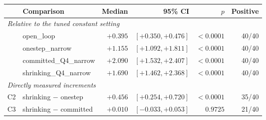 \begin{tabular}{llrrrr}
\toprule
& Comparison & Median & 95\% CI & $p$ & Positive \\
\midrule
\multicolumn{6}{l}{\emph{Relative to the tuned constant setting}} \\
 & open\_loop & $+0.395$ & $[+0.350, +0.476]$ & ${<}0.0001$ & 40/40 \\
 & onestep\_narrow & $+1.155$ & $[+1.092, +1.811]$ & ${<}0.0001$ & 40/40 \\
 & committed\_Q4\_narrow & $+2.090$ & $[+1.532, +2.407]$ & ${<}0.0001$ & 40/40 \\
 & shrinking\_Q4\_narrow & $+1.690$ & $[+1.462, +2.368]$ & ${<}0.0001$ & 40/40 \\
\midrule
\multicolumn{6}{l}{\emph{Directly measured increments}} \\
C2 & shrinking $-$ onestep & $+0.456$ & $[+0.254, +0.720]$ & ${<}0.0001$ & 35/40 \\
C3 & shrinking $-$ committed & $+0.010$ & $[-0.033, +0.053]$ & $0.9725$ & 21/40 \\
\bottomrule
\end{tabular}
